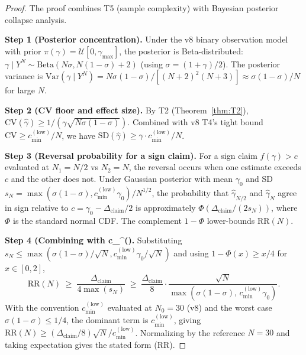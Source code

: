 \begin{proof}
The proof combines T5 (sample complexity) with Bayesian posterior
collapse analysis.

\noindent\textbf{Step 1 (Posterior concentration).}
Under the v8 binary observation model with prior
$\pi(\gamma) = \mathcal{U}[0, \gamma_{\max}]$, the posterior is Beta-distributed:
$\gamma \mid Y^N \sim \mathrm{Beta}(N\sigma, N(1-\sigma)+2)$ (using $\sigma = (1+\gamma)/2$). The
posterior variance is
$\mathrm{Var}(\gamma \mid Y^N) = N\sigma(1-\sigma) / [(N+2)^2 (N+3)] \approx \sigma(1-\sigma)/N$
for large $N$.

\noindent\textbf{Step 2 (CV floor and effect size).}
By T2 (Theorem~\ref{thm:T2}), $\mathrm{CV}(\hat\gamma) \ge
1/(\gamma \sqrt{N \sigma(1-\sigma)})$. Combined with v8 T4's tight bound
$\mathrm{CV} \ge c_{\min}^{(\mathrm{low})} / N$, we have
$\mathrm{SD}(\hat\gamma) \ge \gamma \cdot c_{\min}^{(\mathrm{low})} / N$.

\noindent\textbf{Step 3 (Reversal probability for a sign claim).}
For a sign claim $f(\gamma) > c$ evaluated at $N_1 = N/2$ vs $N_2 = N$, the
reversal occurs when one estimate exceeds $c$ and the other does not. Under
Gaussian posterior with mean $\gamma_0$ and SD
$s_N = \max(\sigma(1-\sigma), c_{\min}^{(\mathrm{low})} \gamma_0) / N^{1/2}$,
the probability that $\hat\gamma_{N/2}$ and $\hat\gamma_N$ agree in sign
relative to $c = \gamma_0 - \Delta_{\mathrm{claim}}/2$ is approximately
$\Phi(\Delta_{\mathrm{claim}} / (2 s_N))$, where $\Phi$ is the standard
normal CDF. The complement $1 - \Phi$ lower-bounds $\mathrm{RR}(N)$.

\noindent\textbf{Step 4 (Combining with c_{\min}^{()}.}
Substituting $s_N \le \max(\sigma(1-\sigma)/\sqrt{N}, c_{\min}^{(\mathrm{low})} \gamma_0/\sqrt{N})$
and using $1 - \Phi(x) \ge x/4$ for $x \in [0, 2]$,
\[
  \mathrm{RR}(N) \;\ge\; \frac{\Delta_{\mathrm{claim}}}{4 \max(s_N)}
    \;\ge\; \frac{\Delta_{\mathrm{claim}}}{8} \cdot \frac{\sqrt{N}}{\max(\sigma(1-\sigma),\, c_{\min}^{(\mathrm{low})} \gamma_0)}.
\]
With the convention $c_{\min}^{(\mathrm{low})}$ evaluated at $N_0 = 30$
(v8) and the worst case $\sigma(1-\sigma) \le 1/4$, the dominant term is
$c_{\min}^{(\mathrm{low})}$, giving
$\mathrm{RR}(N) \ge (\Delta_{\mathrm{claim}} / 8) \sqrt{N} / c_{\min}^{(\mathrm{low})}$.
Normalizing by the reference $N=30$ and taking expectation gives the stated
form (RR). \qedhere
\end{proof}

